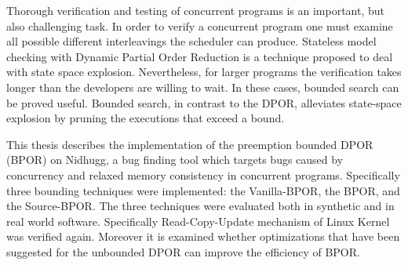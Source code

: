 Thorough verification and testing of concurrent programs is an important, but also
challenging task. In order to verify a concurrent program one must examine all possible 
different interleavings the scheduler can produce. Stateless model checking with Dynamic Partial Order Reduction 
is a technique proposed to deal with state space explosion. Nevertheless, for larger programs the verification 
takes longer than the developers are willing to wait. In these cases, bounded search can be proved useful. Bounded search,
in contrast to the DPOR, alleviates state-space explosion by pruning the executions that exceed a bound. 

This thesis describes the implementation of the preemption bounded DPOR (BPOR) on Nidhugg, a bug finding tool which targets bugs caused by concurrency
and relaxed memory consistency in concurrent programs. Specifically three bounding techniques were implemented: the Vanilla-BPOR, the BPOR,
and the Source-BPOR. The three techniques were evaluated both in synthetic and in real world software. Specifically Read-Copy-Update mechanism of Linux Kernel
was verified again. Moreover it is examined whether optimizations that have been suggested for the 
unbounded DPOR can improve the efficiency of BPOR.